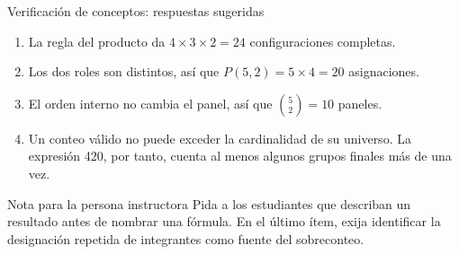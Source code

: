 \documentclass[aspectratio=169,10pt,spanish]{beamer}
\begin{document}
\appendix

\begin{frame}{Verificación de conceptos: respuestas sugeridas}
  \begin{enumerate}
    \item La regla del producto da $4\times3\times2=24$ configuraciones
      completas.
    \item Los dos roles son distintos, así que $P(5,2)=5\times4=20$
      asignaciones.
    \item El orden interno no cambia el panel, así que $\binom{5}{2}=10$
      paneles.
    \item Un conteo válido no puede exceder la cardinalidad de su universo.
      La expresión 420, por tanto, cuenta al menos algunos grupos finales
      más de una vez.
  \end{enumerate}

  \begin{block}{Nota para la persona instructora}
    Pida a los estudiantes que describan un resultado antes de nombrar una
    fórmula. En el último ítem, exija identificar la designación repetida de
    integrantes como fuente del sobreconteo.
  \end{block}
\end{frame}
\end{document}

